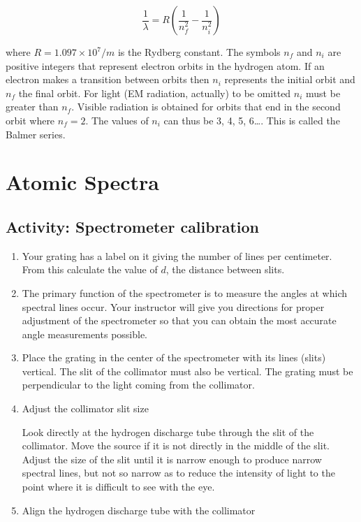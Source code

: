 \begin{multicols}{2}
\begin{equation}\label{e:balmer}
	\frac{1}{\lambda}= R\left(\frac{1}{n_f^2}-\frac{1}{n_i^2}\right)
\end{equation}

where $R = 1.097 \times 10^7/m$ is the Rydberg constant.  The symbols $n_f$ and $n_i$ are positive integers that represent electron orbits in the hydrogen atom.  If an electron makes a transition between orbits then $n_i$ represents the initial orbit and $n_f$ the final orbit.  For light (EM radiation, actually) to be omitted $n_i$ must be greater than $n_f$.  Visible radiation is obtained for orbits that end in the second orbit where $n_f = 2$.  The values of $n_i$ can thus be 3, 4, 5, 6\dots .  This is called the Balmer series.

\section{Atomic Spectra}

\subsection{Activity: Spectrometer calibration}
\begin{enumerate}
	 \item 	Your grating has a label on it giving the number of lines per centimeter.  From this calculate the value of $d$, the distance between slits.
	 \item 	The primary function of the spectrometer is to measure the angles at which spectral lines occur.  Your instructor will give you directions for proper adjustment of the spectrometer so that you can obtain the most accurate angle measurements possible.
	 \item 	Place the grating in the center of the spectrometer with its lines (slits) vertical.  The slit of the collimator must also be vertical.  The grating must be perpendicular to the light coming from the collimator.
	\item Adjust the collimator slit size
	
	Look directly at the hydrogen discharge tube through the slit of the collimator.  Move the source if it is not directly in the middle of the slit.  Adjust the size of the slit until it is narrow enough to produce narrow spectral lines, but not so narrow as to reduce the intensity of light to the point where it is difficult to see with the eye.
	\item Align the hydrogen discharge tube with the collimator
	

\end{enumerate}
\end{multicols}
